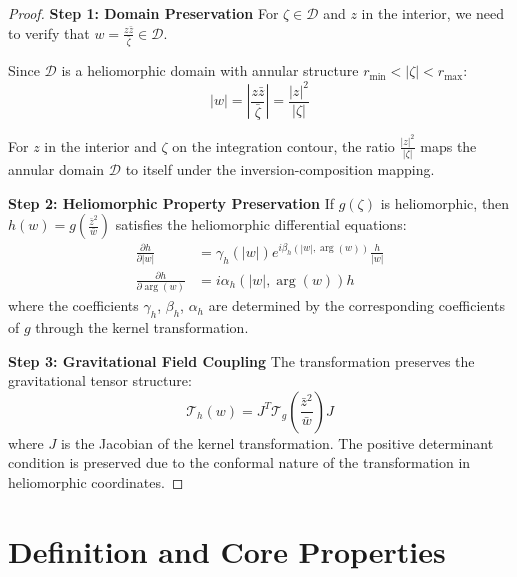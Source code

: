 \begin{proof}
\textbf{Step 1: Domain Preservation}
For $\zeta \in \mathcal{D}$ and $z$ in the interior, we need to verify that $w = \frac{z\bar{z}}{\bar{\zeta}} \in \mathcal{D}$.

Since $\mathcal{D}$ is a heliomorphic domain with annular structure $r_{\min} < |\zeta| < r_{\max}$:
$$|w| = \left|\frac{z\bar{z}}{\bar{\zeta}}\right| = \frac{|z|^2}{|\zeta|}$$

For $z$ in the interior and $\zeta$ on the integration contour, the ratio $\frac{|z|^2}{|\zeta|}$ maps the annular domain $\mathcal{D}$ to itself under the inversion-composition mapping.

\textbf{Step 2: Heliomorphic Property Preservation}
If $g(\zeta)$ is heliomorphic, then $h(w) = g\left(\frac{\bar{z}^2}{\bar{w}}\right)$ satisfies the heliomorphic differential equations:
\begin{align}
\frac{\partial h}{\partial |w|} &= \gamma_h(|w|)e^{i\beta_h(|w|,\arg(w))}\frac{h}{|w|}\\
\frac{\partial h}{\partial \arg(w)} &= i\alpha_h(|w|,\arg(w))h
\end{align}
where the coefficients $\gamma_h$, $\beta_h$, $\alpha_h$ are determined by the corresponding coefficients of $g$ through the kernel transformation.

\textbf{Step 3: Gravitational Field Coupling}
The transformation preserves the gravitational tensor structure:
$$\mathcal{T}_h(w) = J^T \mathcal{T}_g\left(\frac{\bar{z}^2}{\bar{w}}\right) J$$
where $J$ is the Jacobian of the kernel transformation. The positive determinant condition is preserved due to the conformal nature of the transformation in heliomorphic coordinates.
\end{proof}

\section{Definition and Core Properties}

